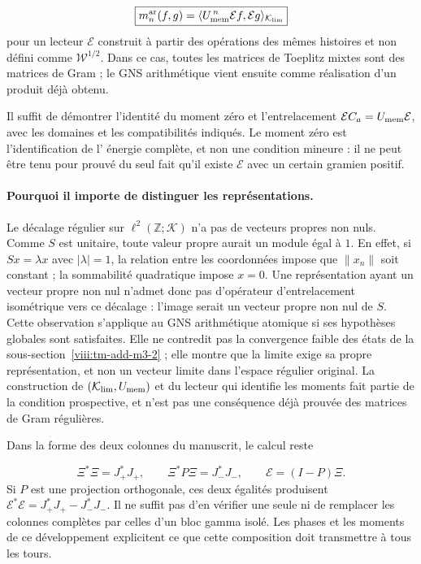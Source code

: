 \[
\boxed{m_n^{\mathrm{ar}}(f,g)
=\langle U_{\rm mem}^{\,n}\mathcal E f,\mathcal E g\rangle_{\mathcal K_{\rm lim}}}
\]
pour un lecteur \(\mathcal E\) construit à partir des opérations des mêmes histoires et non défini comme \(\mathscr W^{1/2}\). Dans ce cas, toutes les matrices de Toeplitz mixtes sont des matrices de Gram ; le GNS arithmétique vient ensuite comme réalisation d'un produit déjà obtenu.

Il suffit de démontrer l'identité du moment zéro et l'entrelacement
\(\mathcal E C_a=U_{\rm mem}\mathcal E\), avec les domaines et les
compatibilités indiqués. Le moment zéro est l'identification de l'
énergie complète, et non une condition mineure : il ne peut être tenu pour prouvé
du seul fait qu'il existe \(\mathcal E\) avec un certain gramien positif.

\paragraph{Pourquoi il importe de distinguer les représentations.}
Le décalage régulier sur \(\ell^2(\mathbb Z;\mathcal K)\)
n'a pas de vecteurs propres non nuls. Comme \(S\) est unitaire, toute
valeur propre aurait un module égal à \(1\). En effet, si \(Sx=\lambda x\)
avec \(|\lambda|=1\), la relation entre les coordonnées impose que
\(\|x_n\|\) soit constant ; la sommabilité quadratique impose \(x=0\).
Une représentation ayant un vecteur propre non nul n'admet donc pas
d'opérateur d'entrelacement isométrique vers ce décalage : l'image serait
un vecteur propre non nul de \(S\). Cette observation s'applique au
GNS arithmétique atomique si ses hypothèses globales sont satisfaites. Elle ne
contredit pas la convergence faible des états de la
sous-section~\ref{viii:tm-add-m3-2} ; elle montre que la limite exige sa propre
représentation, et non un vecteur limite dans l'espace régulier original.
La construction de \((\mathcal K_{\rm lim},U_{\rm mem})\) et du
lecteur qui identifie les moments fait partie de la condition prospective,
et n'est pas une conséquence déjà prouvée des matrices de Gram régulières.

Dans la forme des deux colonnes du manuscrit, le calcul reste

\[
\Xi^*\Xi=J_+^*J_+,\qquad
\Xi^*P\Xi=J_-^*J_-,\qquad
\mathcal E=(I-P)\Xi.
\]
Si \(P\) est une projection orthogonale, ces deux égalités produisent \(\mathcal E^*\mathcal E=J_+^*J_+-J_-^*J_-\). Il ne suffit pas d'en vérifier une seule ni de remplacer les colonnes complètes par celles d'un bloc gamma isolé. Les phases et les moments de ce développement explicitent ce que cette composition doit transmettre à tous les tours.

